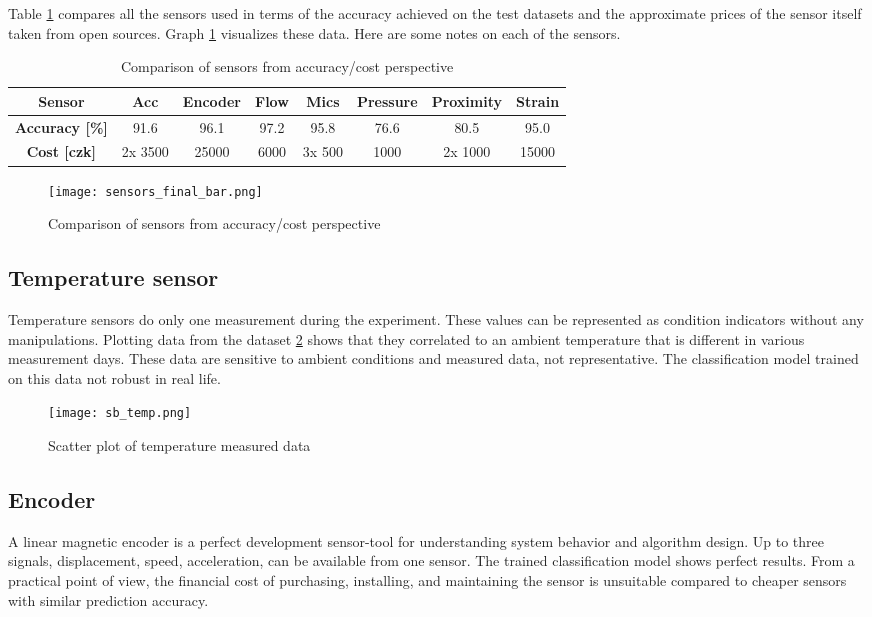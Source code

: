 Table \ref{tab:sensors_final} compares all the sensors used in terms of the
accuracy achieved on the test datasets and the approximate prices of the
sensor itself taken from open sources.  Graph \ref{fig:sensors_final_bar}
visualizes these data. Here are some notes on each of the sensors. 



\begin{table}[h]
    \centering
    \begin{tabular}{|c|c|c|c|c|c|c|c|}
        \hline
        \textbf{Sensor}   & Acc & Encoder & Flow & Mics & Pressure & Proximity & Strain \\
        \hline
        \textbf{Accuracy [\%]} & 91.6 & 96.1 & 97.2 & 95.8 & 76.6 & 80.5 & 95.0 \\
        \hline
        \textbf{Cost [czk]} & 2x 3500 & 25000 & 6000 & 3x 500 & 1000 & 2x 1000 & 15000 \\
        \hline
    \end{tabular}
    \caption{Comparison of sensors from accuracy/cost perspective}
    \label{tab:sensors_final}
\end{table}

\begin{figure}[h!]
    \centering
    \texttt{[image: sensors\_final\_bar.png]}
    \caption{Comparison of sensors from accuracy/cost perspective}
    \label{fig:sensors_final_bar}
\end{figure}

\subsection{Temperature sensor}
Temperature sensors do only one measurement during the experiment.  These
values can be represented as condition indicators without any
manipulations. Plotting data from the dataset \ref{fig:temp_scatter} shows
that they correlated to an ambient temperature that is different in various
measurement days. These data are sensitive to ambient conditions and
measured data, not representative. The classification model trained on this
data not robust in real life.


\begin{figure}[h!]
    \centering
    \texttt{[image: sb\_temp.png]}
    \caption{Scatter plot of temperature measured data}
    \label{fig:temp_scatter}
\end{figure}

\subsection{Encoder}
A linear magnetic encoder is a perfect development sensor-tool for
understanding system behavior and algorithm design. Up to three signals,
displacement, speed, acceleration, can be available from one sensor. The
trained classification model shows perfect results. From a practical point
of view, the financial cost of purchasing, installing, and maintaining the
sensor is unsuitable compared to cheaper sensors with similar prediction
accuracy.

